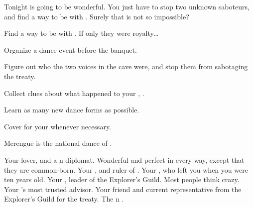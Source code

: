 \documentclass[char]{NeptuneBall}
\begin{document}
Tonight is going to be wonderful. You just have to stop two unknown saboteurs, and find a way to be with \cDiplomat{}. Surely that is not so impossible?

\begin{itemz}[Goals]
  \item Find a way to be with \cDiplomat{}. If only they were royalty\ldots
  \item Organize a dance event before the banquet.
  \item Figure out who the two voices in the cave were, and stop them from sabotaging the treaty.
  \item Collect clues about what happened to your \cQueen{\parent}, \cQueen{\King} \cQueen{}.
  \item Learn as many new dance forms as possible.
  \item Cover for your \cKing{\parent} whenever necessary.
\end{itemz}

\begin{itemz}[Trivia]
  \item Merengue is the national dance of \pAtlantis{}.
\end{itemz}

\begin{contacts}
  \contact{\cDiplomat{}} Your lover, and a \pPacifica{}n diplomat. Wonderful and perfect in every way, except that they are common-born.
  \contact{\cKing{}} Your \cKing{\parent}, and ruler of \pAtlantis{}.
  \contact{\cAriel{}} Your \cAriel{\sibling}, who left you when you were ten years old.
  \contact{\cPlant{}} Your \cPlant{\uncle}, leader of the Explorer's Guild. Most people think \cPlant{\they} \cPlant{\are} crazy.
  \contact{\cManta{}} Your \cKing{\parent}'s most trusted advisor.
  \contact{\cPriest{}} Your friend and current representative from the Explorer's Guild for the treaty.
  \contact{\cPrince{}} The \pPacifica{}n \cPrince{\prince}.
\end{contacts}
\end{document}
